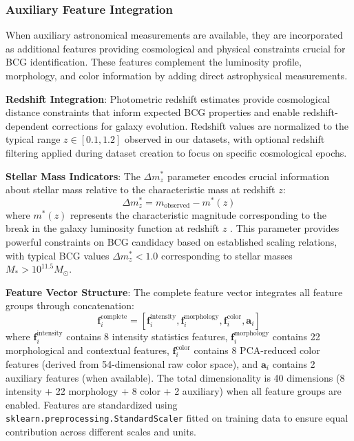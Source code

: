 \documentclass[twocolumn,10pt]{aastex631}
\begin{document}
\subsubsection{Auxiliary Feature Integration}

When auxiliary astronomical measurements are available, they are incorporated as additional features providing cosmological and physical constraints crucial for BCG identification. These features complement the luminosity profile, morphology, and color information by adding direct astrophysical measurements.

\textbf{Redshift Integration}: Photometric redshift estimates provide cosmological distance constraints that inform expected BCG properties and enable redshift-dependent corrections for galaxy evolution. Redshift values are normalized to the typical range $z \in [0.1, 1.2]$ observed in our datasets, with optional redshift filtering applied during dataset creation to focus on specific cosmological epochs.

\textbf{Stellar Mass Indicators}: The $\Delta m^*_z$ parameter encodes crucial information about stellar mass relative to the characteristic mass at redshift $z$:
\begin{equation}
\Delta m^*_z = m_{\text{observed}} - m^*(z)
\end{equation}
where $m^*(z)$ represents the characteristic magnitude corresponding to the break in the galaxy luminosity function at redshift $z$ \citep{Rykoff2016DES}. This parameter provides powerful constraints on BCG candidacy based on established scaling relations, with typical BCG values $\Delta m^*_z < 1.0$ corresponding to stellar masses $M_* > 10^{11.5} M_{\odot}$.

\textbf{Feature Vector Structure}: The complete feature vector integrates all feature groups through concatenation:
\begin{equation}
\mathbf{f}_i^{\text{complete}} = [\mathbf{f}_i^{\text{intensity}}, \mathbf{f}_i^{\text{morphology}}, \mathbf{f}_i^{\text{color}}, \mathbf{a}_i]
\end{equation}
where $\mathbf{f}_i^{\text{intensity}}$ contains 8 intensity statistics features, $\mathbf{f}_i^{\text{morphology}}$ contains 22 morphological and contextual features, $\mathbf{f}_i^{\text{color}}$ contains 8 PCA-reduced color features (derived from 54-dimensional raw color space), and $\mathbf{a}_i$ contains 2 auxiliary features (when available). The total dimensionality is 40 dimensions (8 intensity + 22 morphology + 8 color + 2 auxiliary) when all feature groups are enabled. Features are standardized using \texttt{sklearn.preprocessing.StandardScaler} fitted on training data to ensure equal contribution across different scales and units.
\end{document}
